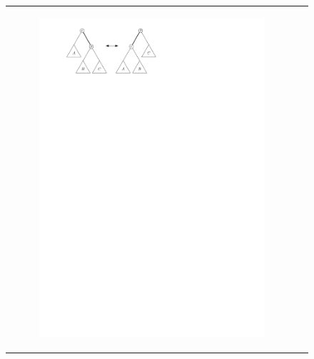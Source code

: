 \begin{figure}[h!]
\begin{tabular}{cc}

\begin{subfigure}{0.45\textwidth}
  \centering
  \includegraphics[width=.99\linewidth]{../img/single_rotation}
\end{subfigure}&


\end{tabular}
\end{figure}
